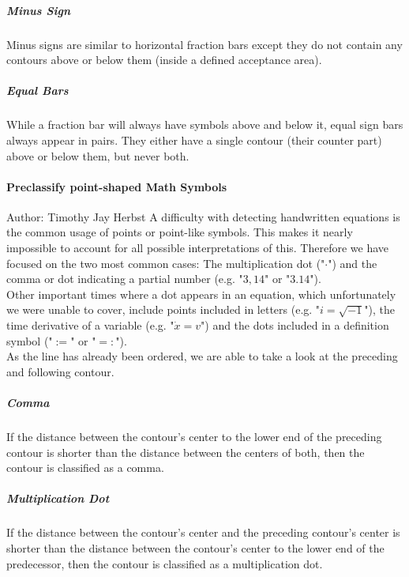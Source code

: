 \documentclass[12pt]{article}
\begin{document}
	\subparagraph{Minus Sign}
	Minus signs are similar to horizontal fraction bars except they do not contain any contours above or below them (inside a defined acceptance area).

	\subparagraph{Equal Bars}\label{equalbars}
	While a fraction bar will always have symbols above and below it, equal sign bars always appear in pairs. They either have a single contour (their counter part) above or below them, but never both.
	
	\paragraph{Preclassify point-shaped Math Symbols}
	\small{Author: Timothy Jay Herbst} \newline \newline
	A difficulty with detecting handwritten equations is the common usage of points or point-like symbols.
	This makes it nearly impossible to account for all possible interpretations of this.
	Therefore we have focused on the two most common cases:
	The multiplication dot ("$\cdot$") and the comma or dot indicating a partial number (e.g. "$3,14$" or "$3.14$").\\
	Other important times where a dot appears in an equation, which unfortunately we were unable to cover, include points included in letters (e.g. "$i=\sqrt{-1}$"), the time derivative of a variable (e.g. "$\dot{x}=v$") and the dots included in a definition symbol ("$:=$" or "$=:$").\\  %
	As the line has already been ordered, we are able to take a look at the preceding and following contour.
	
	\subparagraph{Comma}
	If the distance between the contour's center to the lower end of the preceding contour is shorter than the distance between the centers of both, then the contour is classified as a comma.\\
	
	\subparagraph{Multiplication Dot}
	If the distance between the contour's center and the preceding contour's center is shorter than the distance between the contour's center to the lower end of the predecessor, then the contour is classified as a multiplication dot.\\
\end{document}
